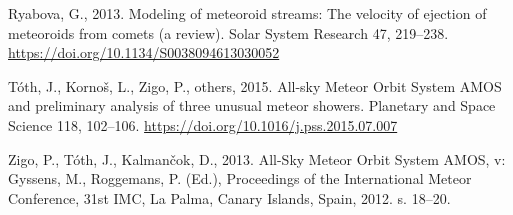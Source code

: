 \hypertarget{ref-ryabova2013}{}
Ryabova, G., 2013. Modeling of meteoroid streams: The velocity of
ejection of meteoroids from comets (a review). Solar System Research 47,
219--238. \url{https://doi.org/10.1134/S0038094613030052}

\hypertarget{ref-toth2015}{}
Tóth, J., Kornoš, L., Zigo, P., others, 2015. All-sky Meteor Orbit
System AMOS and preliminary analysis of three unusual meteor showers.
Planetary and Space Science 118, 102--106.
\url{https://doi.org/10.1016/j.pss.2015.07.007}

\hypertarget{ref-zigo2013}{}
Zigo, P., Tóth, J., Kalmančok, D., 2013. All-Sky Meteor Orbit System
AMOS, v: Gyssens, M., Roggemans, P. (Ed.), Proceedings of the
International Meteor Conference, 31st IMC, La Palma, Canary Islands,
Spain, 2012. s. 18--20.
